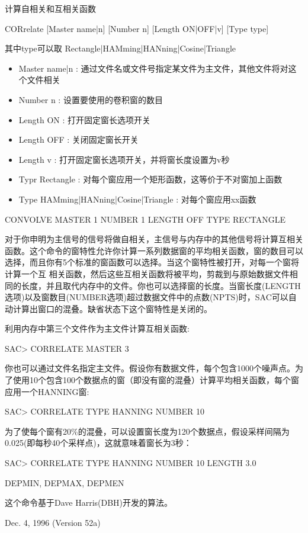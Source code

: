 \label{cmd:correlate}

计算自相关和互相关函数

CORrelate [Master name|n] [Number n] [Length ON|OFF|v] [Type type]

其中type可以取 Rectangle|HAMming|HANning|Cosine|Triangle

\begin{itemize}
\item Master name|n : 通过文件名或文件号指定某文件为主文件，其他文件将对这个文件相关
\item Number n : 设置要使用的卷积窗的数目
\item Length ON : 打开固定窗长选项开关
\item Length OFF : 关闭固定窗长开关
\item Length v : 打开固定窗长选项开关，并将窗长度设置为v秒
\item Typr Rectangle : 对每个窗应用一个矩形函数，这等价于不对窗加上函数
\item Type HAMming|HANning|Cosine|Triangle : 对每个窗应用xx函数
\end{itemize}

CONVOLVE MASTER 1 NUMBER 1 LENGTH OFF TYPE RECTANGLE

对于你申明为主信号的信号将做自相关，主信号与内存中的其他信号将计算互相关函数。这个命令的窗特性允许你计算一系列数据窗的平均相关函数，窗的数目可以选择，而且你有5个标准的窗函数可以选择。当这个窗特性被打开，对每一个窗将计算一个互	相关函数，然后这些互相关函数将被平均，剪裁到与原始数据文件相同的长度，并且取代内存中的文件。你也可以选择窗的长度。当窗长度(LENGTH选项)以及窗数目(NUMBER选项)超过数据文件中的点数(NPTS)时，SAC可以自动计算出窗口的混叠。缺省状态下这个窗特性是关闭的。

利用内存中第三个文件作为主文件计算互相关函数:
\begin{SACCode}
SAC> CORRELATE MASTER 3
\end{SACCode}
你也可以通过文件名指定主文件。假设你有数据文件，每个包含1000个噪声点。为了使用10个包含100个数据点的窗（即没有窗的混叠）计算平均相关函数，每个窗应用一个HANNING窗:
\begin{SACCode}
SAC> CORRELATE TYPE HANNING NUMBER 10
\end{SACCode}
为了使每个窗有20\%的混叠，可以设置窗长度为120个数据点，假设采样间隔为0.025(即每秒40个采样点)，这就意味着窗长为3秒：
\begin{SACCode}
SAC> CORRELATE TYPE HANNING NUMBER 10 LENGTH 3.0
\end{SACCode}

DEPMIN, DEPMAX, DEPMEN

这个命令基于Dave Harris(DBH)开发的算法。

Dec. 4, 1996 (Version 52a)

